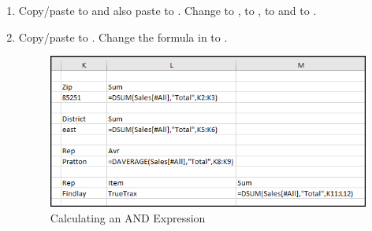 \begin{enumerate}
	\item Copy/paste  to  and also paste  to . Change  to ,  to ,  to  and  to .
	\item Copy/paste  to . Change the formula in  to .
	
	\begin{figure}[H]
		\centering
		\includegraphics[width=\maxwidth{.95\linewidth}]{gfx/ch09_fig22}
		\caption{Calculating an AND Expression}
		\label{09:fig22}
	\end{figure}
	

\end{enumerate}
